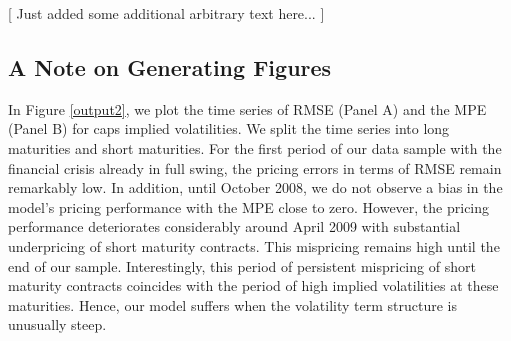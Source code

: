 \documentclass[11pt,a4paper,english,oneside]{book}
\numberwithin{equation}{chapter}
\begin{document}
[ Just added some additional arbitrary text here... ]
\lipsum



\subsection{A Note on Generating Figures}



In Figure \ref{output2}, we plot the time series of RMSE  (Panel A) and the MPE (Panel B) for caps implied volatilities. We split the time series into long maturities and short maturities. For the first period of our data sample with the financial crisis already in full swing, the pricing errors in terms of RMSE remain remarkably low. In addition, until October 2008, we do not observe a bias in the model's pricing performance with the MPE close to zero. However, the pricing performance deteriorates considerably around April 2009 with substantial underpricing of short maturity contracts. This mispricing remains high until the end of our sample. Interestingly, this period of persistent mispricing of short maturity contracts coincides with the period of high implied volatilities at these maturities. Hence, our model suffers when the volatility term structure is unusually steep.
\end{document}
